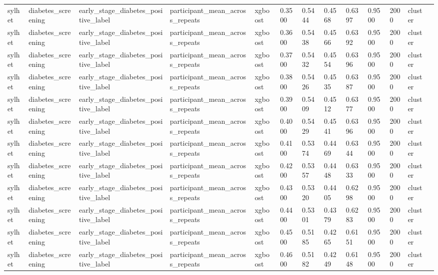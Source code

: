 \begin{tabular}{lllllllllllll}
sylhet & diabetes\_screening & early\_stage\_diabetes\_positive\_label & participant\_mean\_across\_repeats & xgboost & 0.3500 & 0.5444 & 0.4568 & 0.6397 & 0.9500 & 2000 & cluster &  \\
sylhet & diabetes\_screening & early\_stage\_diabetes\_positive\_label & participant\_mean\_across\_repeats & xgboost & 0.3600 & 0.5438 & 0.4566 & 0.6392 & 0.9500 & 2000 & cluster &  \\
sylhet & diabetes\_screening & early\_stage\_diabetes\_positive\_label & participant\_mean\_across\_repeats & xgboost & 0.3700 & 0.5432 & 0.4554 & 0.6396 & 0.9500 & 2000 & cluster &  \\
sylhet & diabetes\_screening & early\_stage\_diabetes\_positive\_label & participant\_mean\_across\_repeats & xgboost & 0.3800 & 0.5426 & 0.4535 & 0.6387 & 0.9500 & 2000 & cluster &  \\
sylhet & diabetes\_screening & early\_stage\_diabetes\_positive\_label & participant\_mean\_across\_repeats & xgboost & 0.3900 & 0.5409 & 0.4512 & 0.6377 & 0.9500 & 2000 & cluster &  \\
sylhet & diabetes\_screening & early\_stage\_diabetes\_positive\_label & participant\_mean\_across\_repeats & xgboost & 0.4000 & 0.5429 & 0.4541 & 0.6396 & 0.9500 & 2000 & cluster &  \\
sylhet & diabetes\_screening & early\_stage\_diabetes\_positive\_label & participant\_mean\_across\_repeats & xgboost & 0.4100 & 0.5374 & 0.4469 & 0.6344 & 0.9500 & 2000 & cluster &  \\
sylhet & diabetes\_screening & early\_stage\_diabetes\_positive\_label & participant\_mean\_across\_repeats & xgboost & 0.4200 & 0.5357 & 0.4448 & 0.6333 & 0.9500 & 2000 & cluster &  \\
sylhet & diabetes\_screening & early\_stage\_diabetes\_positive\_label & participant\_mean\_across\_repeats & xgboost & 0.4300 & 0.5320 & 0.4405 & 0.6298 & 0.9500 & 2000 & cluster &  \\
sylhet & diabetes\_screening & early\_stage\_diabetes\_positive\_label & participant\_mean\_across\_repeats & xgboost & 0.4400 & 0.5301 & 0.4379 & 0.6283 & 0.9500 & 2000 & cluster &  \\
sylhet & diabetes\_screening & early\_stage\_diabetes\_positive\_label & participant\_mean\_across\_repeats & xgboost & 0.4500 & 0.5185 & 0.4265 & 0.6151 & 0.9500 & 2000 & cluster &  \\
sylhet & diabetes\_screening & early\_stage\_diabetes\_positive\_label & participant\_mean\_across\_repeats & xgboost & 0.4600 & 0.5182 & 0.4249 & 0.6148 & 0.9500 & 2000 & cluster &  \\

\end{tabular}

